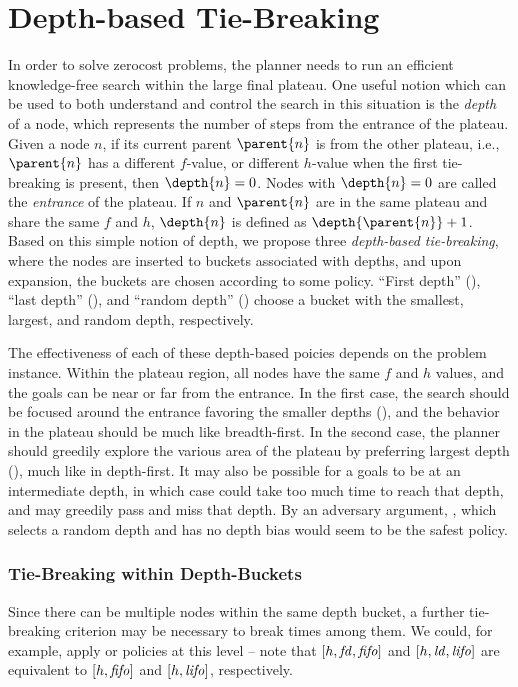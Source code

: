 \section{Depth-based Tie-Breaking}

In order to solve zerocost problems, the planner needs to run an
efficient knowledge-free search within the large final plateau.
One useful notion which can be used to both understand and control the
search in this situation is the \emph{depth} of a node, which represents
the number of steps from the entrance of the plateau.  Given a node $n$,
if its current parent $\parent{n}$ is from the other plateau, i.e.,
$\parent{n}$ has a different $f$-value, or different $h$-value when the
first tie-breaking is present, then $\depth{n} = 0$. Nodes with
$\depth{n} = 0$ are called the \emph{entrance} of the plateau.  If $n$
and $\parent{n}$ are in the same plateau and share the same $f$ and $h$,
$\depth{n}$ is defined as $\depth{\parent{n}} + 1$.  Based on this
simple notion of depth, we propose three \emph{depth-based
tie-breaking}, where the nodes are inserted to buckets associated with
depths, and upon expansion, the buckets are chosen according to some policy.
``First depth'' (\fd), ``last depth'' (\ld), and ``random depth'' (\rd) 
choose a bucket with the smallest,
largest, and random depth, respectively.

The effectiveness of each of these depth-based poicies depends on the
problem instance.  Within
the plateau region, all nodes have the same $f$ and $h$ values, 
and the goals can be near or far
from the entrance.  In the first case, the
search should be focused around the entrance favoring the smaller depths
(\fd), and the behavior in the plateau should be much like breadth-first. In the
second case, the planner should greedily explore the various area of the
plateau by preferring largest depth (\ld), much like in
depth-first. 
It may also be possible for a goals to be at an intermediate depth, in which case
\fd could take too much time to reach that
depth, and \ld may greedily pass and miss that depth.
By an adversary argument, \rd, which selects a random depth and has no depth bias would seem to be the safest policy.


\subsubsection{Tie-Breaking within Depth-Buckets} %
Since there can be multiple nodes within the same depth bucket,
a further tie-breaking criterion may be necessary to break times among them.
We could, for example, apply \lifo or \fifo policies at this level -- 
note that $[h,\mbox{\textit{fd}},\mbox{\textit{fifo}}]$ and $[h,\mbox{\textit{ld}},\mbox{\textit{lifo}}]$ are equivalent to $[h,\mbox{\textit{fifo}}]$ and $[h,\mbox{\textit{lifo}}]$, respectively.

